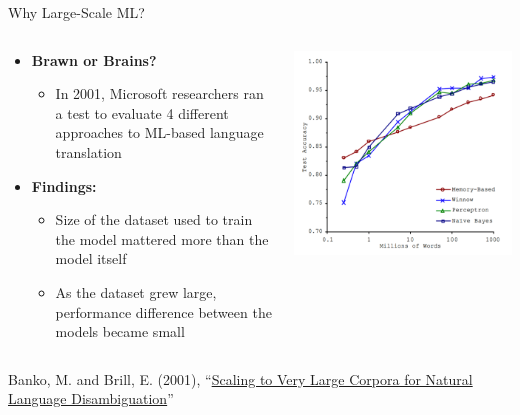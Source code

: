 \begin{frame}{Why Large-Scale ML?}
    \begin{columns}
        \begin{column}{0.6\textwidth}
            \begin{itemize}
                \item \textbf{Brawn or Brains?}
                \begin{itemize}
                    \item In 2001, Microsoft researchers ran a test to evaluate 4 different approaches to ML-based language translation
                \end{itemize}
                \item \textbf{Findings:}
                \begin{itemize}
                    \item Size of the dataset used to train the model mattered more than the model itself
                    \item As the dataset grew large, performance difference between the models became small
                \end{itemize}
            \end{itemize}
        \end{column}
        \begin{column}{0.4\textwidth}
            \includegraphics[width=\linewidth]{images/decision-trees/decision-trees-1.png}
        \end{column}
    \end{columns}

    \vspace{0.3cm}
    \tiny Banko, M. and Brill, E. (2001), ``\href{https://aclanthology.org/P01-1005/}{Scaling to Very Large Corpora for Natural Language Disambiguation}''
\end{frame}


